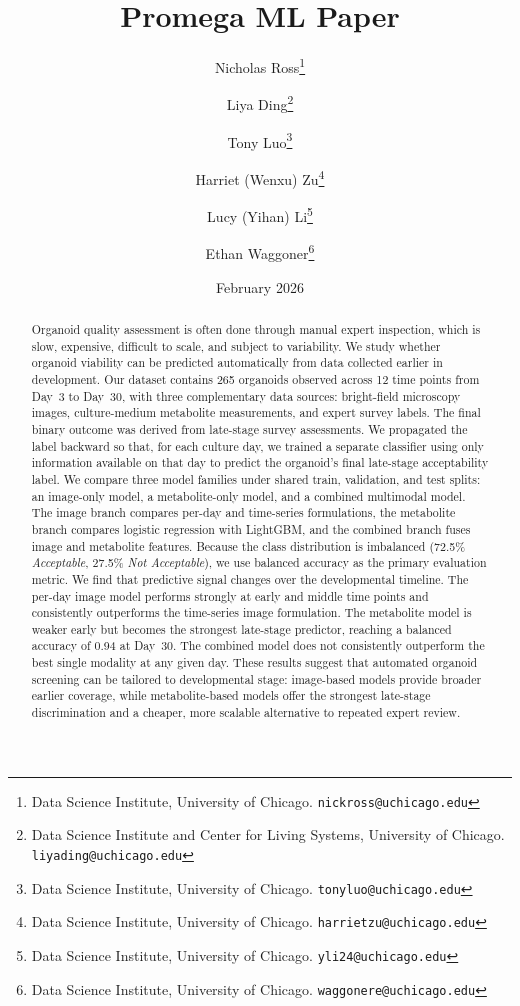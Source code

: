 \documentclass{article}
\title{Promega ML Paper}
\date{February 2026}
\author{
  Nicholas Ross\footnote{Data Science Institute, University of Chicago. \texttt{nickross@uchicago.edu}} \and
  Liya Ding\footnote{Data Science Institute and Center for Living Systems, University of Chicago. \texttt{liyading@uchicago.edu}} \and
  Tony Luo\footnote{Data Science Institute, University of Chicago. \texttt{tonyluo@uchicago.edu}} \and
  Harriet (Wenxu) Zu\footnote{Data Science Institute, University of Chicago. \texttt{harrietzu@uchicago.edu}} \and
  Lucy (Yihan) Li\footnote{Data Science Institute, University of Chicago. \texttt{yli24@uchicago.edu}} \and
  Ethan Waggoner\footnote{Data Science Institute, University of Chicago. \texttt{waggonere@uchicago.edu}}
}
\begin{document}
\maketitle

\begin{abstract}
Organoid quality assessment is often done through manual expert inspection, which is slow, expensive, difficult to scale, and subject to variability. We study whether organoid viability can be predicted automatically from data collected earlier in development. Our dataset contains 265 organoids observed across 12 time points from Day~3 to Day~30, with three complementary data sources: bright-field microscopy images, culture-medium metabolite measurements, and expert survey labels. The final binary outcome was derived from late-stage survey assessments. We propagated the label backward so that, for each culture day, we trained a separate classifier using only information available on that day to predict the organoid's final late-stage acceptability label. We compare three model families under shared train, validation, and test splits: an image-only model, a metabolite-only model, and a combined multimodal model. The image branch compares per-day and time-series formulations, the metabolite branch compares logistic regression with LightGBM, and the combined branch fuses image and metabolite features. Because the class distribution is imbalanced (72.5\% \textit{Acceptable}, 27.5\% \textit{Not Acceptable}), we use balanced accuracy as the primary evaluation metric. We find that predictive signal changes over the developmental timeline. The per-day image model performs strongly at early and middle time points and consistently outperforms the time-series image formulation. The metabolite model is weaker early but becomes the strongest late-stage predictor, reaching a balanced accuracy of 0.94 at Day~30. The combined model does not consistently outperform the best single modality at any given day. These results suggest that automated organoid screening can be tailored to developmental stage: image-based models provide broader earlier coverage, while metabolite-based models offer the strongest late-stage discrimination and a cheaper, more scalable alternative to repeated expert review.
\end{abstract}

\doublespacing
\end{document}
